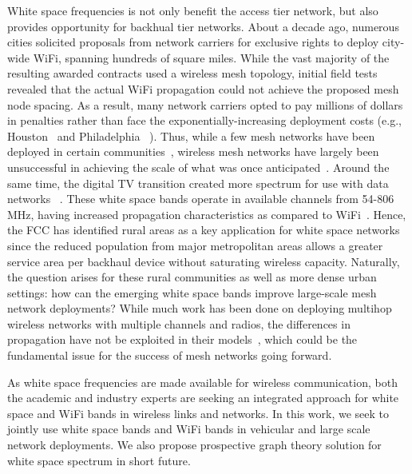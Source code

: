 White space frequencies is not only benefit the access tier network, 
but also provides opportunity for backhual tier networks. About a 
decade ago, numerous cities solicited proposals from network carriers 
for exclusive rights to deploy city-wide WiFi, spanning hundreds of 
square miles. While the vast majority of the resulting awarded 
contracts used a wireless mesh topology, initial field tests revealed 
that the actual WiFi propagation could not achieve the proposed mesh node
spacing. As a result, many network carriers opted to pay millions of 
dollars in penalties rather than face the exponentially-increasing
deployment costs (e.g., Houston~\cite{cnet_aug07} and Philadelphia
~\cite{arstechnica_may08}). Thus, while a few mesh networks have been 
deployed in certain communities~\cite{CRSK06,google_imc08}, wireless 
mesh networks have largely been unsuccessful in achieving the scale 
of what was once anticipated~\cite{taps}. Around the same time, the 
digital TV transition created more spectrum for use with data networks
~\cite{fccwhitespace}. These white space bands operate in available 
channels from 54-806 MHz, having increased propagation characteristics 
as compared to WiFi~\cite{balanis2012antenna}. Hence, the FCC has 
identified rural areas as a key application for white space networks 
since the reduced population from major metropolitan areas allows a 
greater service area per backhaul device without saturating wireless 
capacity. Naturally, the question arises for these rural communities 
as well as more dense urban settings: how can the emerging white space 
bands improve large-scale mesh network deployments?  While much work 
has been done on deploying multihop wireless networks with multiple 
channels and radios, the differences in propagation have not be 
exploited in their models~\cite{raniwala2004centralized,tang2005interference, si2010overview}, 
which could be the fundamental issue for the success of mesh networks 
going forward.

As white space frequencies are made available for wireless communication,
both the academic and  industry experts are seeking an integrated approach
for white space and WiFi bands in wireless links and networks. 
In this work, we seek to jointly use 
white space bands and WiFi bands in vehicular and large scale network deployments. 
We also
propose prospective graph theory solution for white space spectrum 
in short future. 


